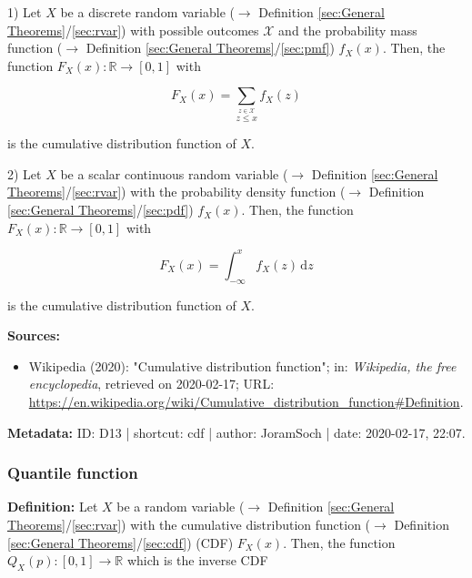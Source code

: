 \documentclass[a4paper,12pt,twoside]{book}
\begin{document}
1) Let $X$ be a discrete random variable ($\rightarrow$ Definition \ref{sec:General Theorems}/\ref{sec:rvar}) with possible outcomes $\mathcal{X}$ and the probability mass function ($\rightarrow$ Definition \ref{sec:General Theorems}/\ref{sec:pmf}) $f_X(x)$. Then, the function $F_X(x): \mathbb{R} \to [0,1]$ with

\begin{equation} \label{eq:cdf-cdf-disc}
F_X(x) = \sum_{\overset{z \in \mathcal{X}}{z \leq x}} f_X(z)
\end{equation}

is the cumulative distribution function of $X$.

\vspace{1em}
2) Let $X$ be a scalar continuous random variable ($\rightarrow$ Definition \ref{sec:General Theorems}/\ref{sec:rvar}) with the probability density function ($\rightarrow$ Definition \ref{sec:General Theorems}/\ref{sec:pdf}) $f_X(x)$. Then, the function $F_X(x): \mathbb{R} \to [0,1]$ with

\begin{equation} \label{eq:cdf-cdf-cont}
F_X(x) = \int_{-\infty}^{x} f_X(z) \, \mathrm{d}z
\end{equation}

is the cumulative distribution function of $X$.


\vspace{1em}
\textbf{Sources:}
\begin{itemize}
\item Wikipedia (2020): "Cumulative distribution function"; in: \textit{Wikipedia, the free encyclopedia}, retrieved on 2020-02-17; URL: \url{https://en.wikipedia.org/wiki/Cumulative_distribution_function#Definition}.
\end{itemize}


\vspace{1em}
\textbf{Metadata:} ID: D13 | shortcut: cdf | author: JoramSoch | date: 2020-02-17, 22:07.
\vspace{1em}



\subsubsection[\textit{Quantile function}]{Quantile function} \label{sec:qf}
\setcounter{equation}{0}

\textbf{Definition:} Let $X$ be a random variable ($\rightarrow$ Definition \ref{sec:General Theorems}/\ref{sec:rvar}) with the cumulative distribution function ($\rightarrow$ Definition \ref{sec:General Theorems}/\ref{sec:cdf}) (CDF) $F_X(x)$. Then, the function $Q_X(p): [0,1] \to \mathbb{R}$ which is the inverse CDF
\end{document}
